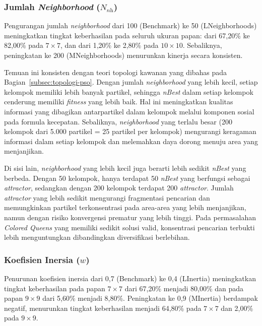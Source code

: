 \subsubsection{Jumlah \textit{Neighborhood} ($N_{\textit{nh}}$)}

Pengurangan jumlah \textit{neighborhood} dari 100 (Benchmark) ke 50 (LNeighborhoods) meningkatkan tingkat keberhasilan pada seluruh ukuran papan: dari 67,20\% ke 82,00\% pada $7 \times 7$, dan dari 1,20\% ke 2,80\% pada $10 \times 10$. Sebaliknya, peningkatan ke 200 (MNeighborhoods) menurunkan kinerja secara konsisten.

Temuan ini konsisten dengan teori topologi kawanan yang dibahas pada Bagian~\ref{subsec:topologi-pso}. Dengan jumlah \textit{neighborhood} yang lebih kecil, setiap kelompok memiliki lebih banyak partikel, sehingga \textit{nBest} dalam setiap kelompok cenderung memiliki \textit{fitness} yang lebih baik. Hal ini meningkatkan kualitas informasi yang dibagikan antarpartikel dalam kelompok melalui komponen sosial pada formula kecepatan. Sebaliknya, \textit{neighborhood} yang terlalu besar (200 kelompok dari 5.000 partikel = 25 partikel per kelompok) mengurangi keragaman informasi dalam setiap kelompok dan melemahkan daya dorong menuju area yang menjanjikan.

Di sisi lain, \textit{neighborhood} yang lebih kecil juga berarti lebih sedikit \textit{nBest} yang berbeda. Dengan 50 kelompok, hanya terdapat 50 \textit{nBest} yang berfungsi sebagai \textit{attractor}, sedangkan dengan 200 kelompok terdapat 200 \textit{attractor}. Jumlah \textit{attractor} yang lebih sedikit mengurangi fragmentasi pencarian dan memungkinkan partikel terkonsentrasi pada area-area yang lebih menjanjikan, namun dengan risiko konvergensi prematur yang lebih tinggi. Pada permasalahan \textit{Colored Queens} yang memiliki sedikit solusi valid, konsentrasi pencarian terbukti lebih menguntungkan dibandingkan diversifikasi berlebihan.

\subsubsection{Koefisien Inersia ($w$)}

Penurunan koefisien inersia dari 0,7 (Benchmark) ke 0,4 (LInertia) meningkatkan tingkat keberhasilan pada papan $7 \times 7$ dari 67,20\% menjadi 80,00\% dan pada papan $9 \times 9$ dari 5,60\% menjadi 8,80\%. Peningkatan ke 0,9 (MInertia) berdampak negatif, menurunkan tingkat keberhasilan menjadi 64,80\% pada $7 \times 7$ dan 2,00\% pada $9 \times 9$.

